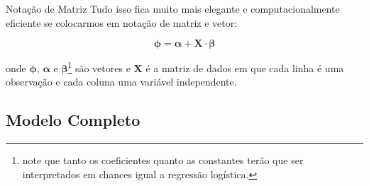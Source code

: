 \begin{frame}{Notação de Matriz}
	Tudo isso fica muito mais elegante e computacionalmente eficiente se
	colocarmos em notação de matriz e vetor:

	$$\boldsymbol{\phi} = \boldsymbol{\alpha} + \mathbf{X} \cdot \boldsymbol{\beta}$$

	onde $\boldsymbol{\phi}$, $\boldsymbol{\alpha}$ e $\boldsymbol{\beta}$\footnote{note que tanto os coeficientes quanto as constantes terão que ser interpretados em chances igual a regressão logística.}
	são vetores e $\mathbf{X}$ é a matriz de dados em que cada linha é uma
	observação e cada coluna uma variável independente.
\end{frame}

\subsection{Modelo Completo}
